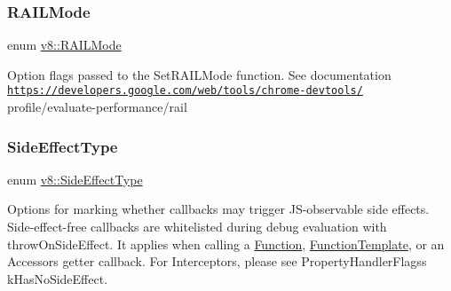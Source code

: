 \subsubsection{\texorpdfstring{R\+A\+I\+L\+Mode}{RAILMode}}
{\footnotesize\ttfamily enum \mbox{\hyperlink{namespacev8_a317cb610383138992c7200c35f8abe5f}{v8\+::\+R\+A\+I\+L\+Mode}}}

Option flags passed to the Set\+R\+A\+I\+L\+Mode function. See documentation \href{https://developers.google.com/web/tools/chrome-devtools/}{\tt https\+://developers.\+google.\+com/web/tools/chrome-\/devtools/} profile/evaluate-\/performance/rail \mbox{\label{namespacev8_a29711319c2b9fc7716d65faee2f7b9cb}} 
\subsubsection{\texorpdfstring{Side\+Effect\+Type}{SideEffectType}}
{\footnotesize\ttfamily enum \mbox{\hyperlink{namespacev8_a29711319c2b9fc7716d65faee2f7b9cb}{v8\+::\+Side\+Effect\+Type}}\hspace{0.3cm}{\ttfamily [strong]}}

Options for marking whether callbacks may trigger J\+S-\/observable side effects. Side-\/effect-\/free callbacks are whitelisted during debug evaluation with throw\+On\+Side\+Effect. It applies when calling a \mbox{\hyperlink{classv8_1_1Function}{Function}}, \mbox{\hyperlink{classv8_1_1FunctionTemplate}{Function\+Template}}, or an Accessor\textquotesingle{}s getter callback. For Interceptors, please see Property\+Handler\+Flags\textquotesingle{}s k\+Has\+No\+Side\+Effect. 